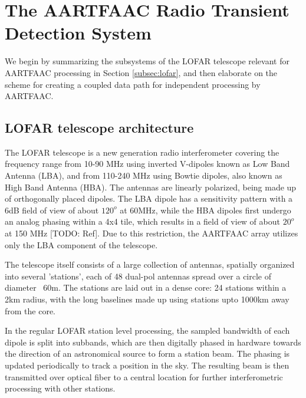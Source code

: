 \documentclass{ws-jai}
\begin{document}
\section {\label{sec:aartfaac_array}The AARTFAAC Radio Transient Detection System}
We  begin by  summarizing the  subsystems of  the LOFAR  telescope relevant  for
AARTFAAC processing  in Section  \ref{subsec:lofar}, and  then elaborate  on the
scheme for creating a coupled data path for independent processing by AARTFAAC.

\subsection {\label{subsec:lofar} LOFAR telescope architecture}
The   LOFAR   telescope  \citep{van2013lofar}   is   a   new  generation   radio
interferometer  covering  the frequency  range  from  10-90 MHz  using  inverted
V-dipoles known  as Low Band  Antenna (LBA), and  from 110-240 MHz  using Bowtie
dipoles,  also known  as High  Band Antenna  (HBA).  The  antennas are  linearly
polarized, being made  up of orthogonally placed dipoles.  The  LBA dipole has a
sensitivity pattern with  a 6dB field of  view of about $120^o$  at 60MHz, while
the HBA dipoles first undergo an analog phasing within a 4x4 tile, which results
in  a field  of view  of  about $20^o$  at 150  MHz  [TODO: Ref].   Due to  this
restriction,  the  AARTFAAC  array  utilizes  only  the  LBA  component  of  the
telescope.

The  telescope itself  consists of  a  large collection  of antennas,  spatially
organized into  several 'stations', each of  48 dual-pol antennas spread  over a
circle of diameter ~60m.  The stations are laid out in a dense core: 24 stations
within a 2km radius, with the long  baselines made up using stations upto 1000km
away from the core.

In the  regular LOFAR station  level processing,  the sampled bandwidth  of each
dipole  is split  into subbands,  which are  then digitally  phased in  hardware
towards the  direction of  an astronomical  source to form  a station  beam. The
phasing is  updated periodically to track  a position in the  sky. The resulting
beam is  then transmitted over optical  fiber to a central  location for further
interferometric processing with other stations.
\end{document}
